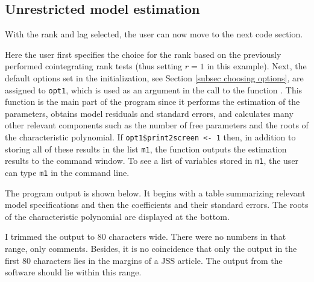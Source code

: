 \documentclass[article]{jss}
\newcommand{\fct}[1]{\code{#1()}}
\begin{document}
\subsection{Unrestricted model estimation}

With the rank and lag selected, the user can now move to the next code section. 
% 

% 
Here the user first specifies the choice for the rank based on the previously performed cointegrating rank tests (thus setting $r=1$ in this example). Next, the default options set in the initialization, see Section \ref{subsec choosing options}, are assigned to \verb|opt1|, which is used as an argument in the call to the function \fct{FCVARestn}. This function is the main part of the program since it performs the estimation of the parameters, obtains model residuals and standard errors, and calculates many other relevant components such as the number of free parameters and the roots of the characteristic polynomial. If \verb|opt1$print2screen <- 1| then, in addition to storing all of these results in the list \verb|m1|, the function outputs the estimation results to the command window. To see a list of variables stored in \verb|m1|, the user can type \verb|m1| in the command line. 

The program output is shown below. It begins with a table summarizing relevant model specifications and then the coefficients and their standard errors. The roots of the characteristic polynomial are displayed at the bottom. 

\begin{leftbar}
I trimmed the output to 80 characters wide. 
There were no numbers in that range, only comments. 
Besides, it is no coincidence that only the output in the first 80 characters lies in the margins of a JSS article.
The output from the software should lie within this range. 
\end{leftbar}
\end{document}
